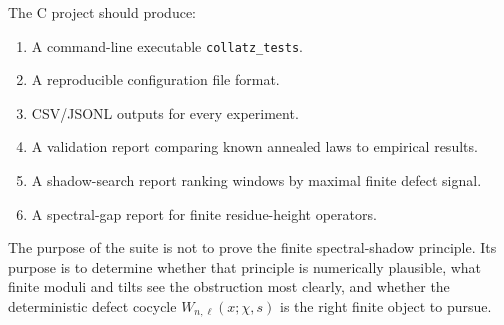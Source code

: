 \documentclass[11pt]{article}
\begin{document}
The C project should produce:

\begin{enumerate}
\item A command-line executable \texttt{collatz\_tests}.
\item A reproducible configuration file format.
\item CSV/JSONL outputs for every experiment.
\item A validation report comparing known annealed laws to empirical results.
\item A shadow-search report ranking windows by maximal finite defect signal.
\item A spectral-gap report for finite residue-height operators.
\end{enumerate}

The purpose of the suite is not to prove the finite spectral-shadow principle.  Its purpose is to determine whether that principle is numerically plausible, what finite moduli and tilts see the obstruction most clearly, and whether the deterministic defect cocycle \(W_{n,\ell}(x;\chi,s)\) is the right finite object to pursue.
\end{document}
